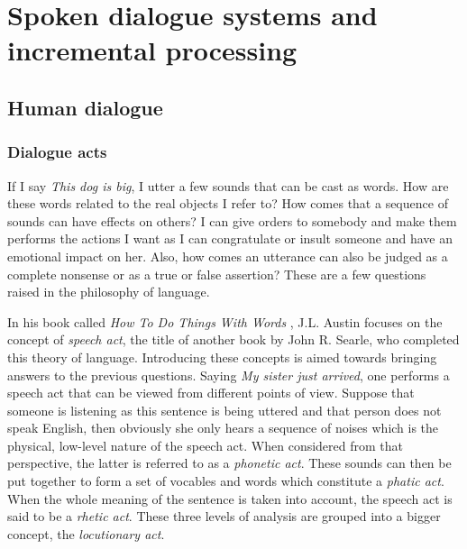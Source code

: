 \chapter{Spoken dialogue systems and incremental processing}
\label{ch:soadialogue}

\section{Human dialogue}
\subsection{Dialogue acts}
    \label{soa:dialogueacts}
    
    If I say \textit{This dog is big}, I utter a few sounds that can be cast as words. How are these words related to the real objects I refer to? How comes that a sequence of sounds can have effects on others? I can give orders to somebody and make them performs the actions I want as I can congratulate or insult someone and have an emotional impact on her. Also, how comes an utterance can also be judged as a complete nonsense or as a true or false assertion? These are a few questions raised in the philosophy of language.
    
    In his book called \textit{How To Do Things With Words} \cite{Austin1962}, J.L. Austin focuses on the concept of \textit{speech act}, the title of another book \cite{Searle1969} by John R. Searle, who completed this theory of language. Introducing these concepts is aimed towards bringing answers to the previous questions. Saying \textit{My sister just arrived}, one performs a speech act that can be viewed from different points of view. Suppose that someone is listening as this sentence is being uttered and that person does not speak English, then obviously she only hears a sequence of noises which is the physical, low-level nature of the speech act. When considered from that perspective, the latter is referred to as a \textit{phonetic act}. These sounds can then be put together to form a set of vocables and words which constitute a \textit{phatic act}. When the whole meaning of the sentence is taken into account, the speech act is said to be a \textit{rhetic act}. These three levels of analysis are grouped into a bigger concept, the \textit{locutionary act}.
    
